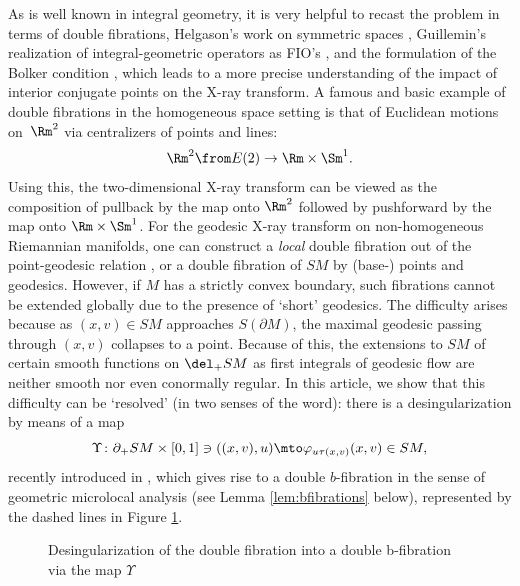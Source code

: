 As is well known in integral geometry, it is very helpful to recast the problem in terms of double fibrations, \cf Helgason's work
on symmetric spaces \cite{Helgason2010}, Guillemin's realization of integral-geometric operators as FIO's \cite{Guillemin1979}, and
the formulation of the Bolker condition \cite{Monard2013b,Holman2015}, which leads to a more precise understanding of the impact
of interior conjugate points on the X-ray transform. A famous and basic example of double fibrations in the homogeneous space setting
is that of Euclidean motions on~$\Rm^2$ via centralizers of points and lines:
\begin{equation*}
\Rm^2 \from E(2) \to \Rm\times\Sm^1.
\end{equation*}
Using this, the two-dimensional X-ray transform can be viewed as the composition of pullback by the map onto $\Rm^2$ followed by
pushforward by the map onto $\Rm \times \Sm^1$. For the geodesic X-ray transform on non-homogeneous Riemannian manifolds,
one can construct a {\em local} double fibration out of the point-geodesic relation \cite{Monard2013b,Gelfand1969}, or a double fibration
of $SM$ by (base-) points and geodesics. However, if $M$ has a strictly convex boundary, such fibrations cannot be extended globally
due to the presence of `short' geodesics. The difficulty arises because as $(x,v)\in SM$ approaches $S(\partial M)$, the maximal geodesic
passing through $(x,v)$ collapses to a point. Because of this, the extensions to $SM$ of certain smooth functions on $\del_+ SM$
as first integrals of geodesic flow are neither smooth nor even conormally regular. In this article, we show that this difficulty
can be `resolved' (in two senses of the word): there is a desingularization by means of a map
\begin{equation}
\Upsilon \colon \partial_+ SM\times [0,1]\ni ((x,v) ,u) \mto \varphi_{u\tau(x,v)}(x,v) \in SM,
\label{eq:Upsilon}
\end{equation}
recently introduced in \cite{Monard2020a}, which gives rise to a double $b$-fibration in the sense of geometric microlocal
analysis \cite{Melrose1992,Grieser2001} (see Lemma \ref{lem:bfibrations} below), represented by the dashed lines in
Figure \ref{fig:doublefib}.
\begin{figure}[htpb]
\centering
{}
\caption{Desingularization of the double fibration into a double b-fibration via the map $\Upsilon$}
\label{fig:doublefib}
\end{figure}

